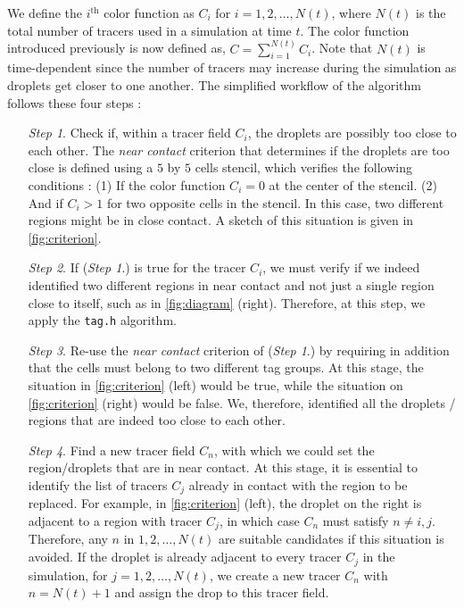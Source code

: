 We define the $i^\text{th}$ color function as $C_i$ for $i =1,2,\ldots,N(t)$, where $N(t)$ is the total number of tracers used in a simulation at time $t$.
The color function introduced previously is now defined as, $C = \sum_{i=1}^{N(t)} C_i$. 
Note that $N(t)$ is time-dependent since the number of tracers may increase during the simulation as droplets get closer to one another.
The simplified workflow of the algorithm follows these four steps : 
\begin{enumerate}
    \item[\textit{Step 1}.] Check if, within a tracer field $C_i$, the droplets are possibly too close to each other. 
    The \textit{near contact} criterion that determines if the droplets are too close is defined using a $5$ by $5$ cells stencil, which verifies the following conditions : 
    (1) If the color function $C_i = 0$ at the center of the stencil. 
    (2) And if $C_i > 1$ for two opposite cells in the stencil. 
    In this case, two different regions might be in close contact.
    A sketch of this situation is given in \ref{fig:criterion}.  
    \item[\textit{Step 2}.] 
    If (\textit{Step 1}.) is true for the tracer $C_i$, we must verify if we indeed identified two different regions in near contact and not just a single region close to itself, such as in \ref{fig:diagram} (right). 
    Therefore, at this step, we apply the \texttt{tag.h} algorithm.
    \item[\textit{Step 3}.] Re-use the \textit{near contact} criterion of (\textit{Step 1}.) by requiring in addition that the cells must belong to two different tag groups. 
    At this stage, the situation in \ref{fig:criterion} (left) would be true, while the situation on \ref{fig:criterion} (right) would be false. 
    We, therefore, identified all the droplets / regions that are indeed too close to each other. 
    \item[\textit{Step 4}.] 
    Find a new tracer field $C_n$, with which we could set the region/droplets that are in near contact. 
    At this stage, it is essential to identify the list of tracers $C_j$ already in contact with the region to be replaced. 
    For example, in \ref{fig:criterion} (left), the droplet on the right is adjacent to a region with tracer $C_j$, in which case $C_n$ must satisfy $n \neq i,j$. 
    Therefore, any $n$ in $1, 2, \ldots, N(t)$ are suitable candidates if this situation is avoided. 
    If the droplet is already adjacent to every tracer $C_j$ in the simulation, for $j = 1, 2, \ldots, N(t)$, we create a new tracer $C_n$ with $n = N(t)+1$ and assign the drop to this tracer field.
\end{enumerate}
